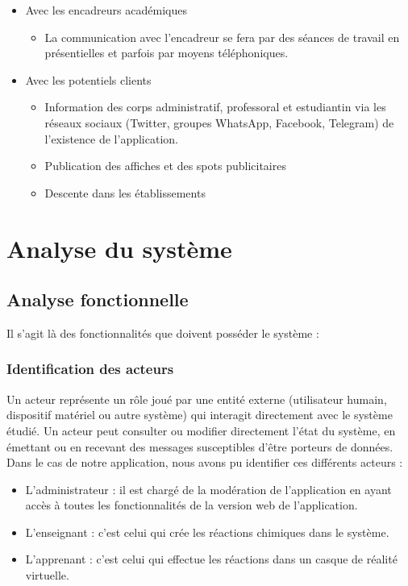 \begin{itemize}
	\item Avec les encadreurs académiques
	      \begin{itemize}
		      \item La communication avec l’encadreur se fera par des séances de travail en présentielles et parfois par moyens téléphoniques.
	      \end{itemize}
	\item Avec les potentiels clients
	      \begin{itemize}
		      \item Information des corps administratif, professoral et estudiantin via les réseaux sociaux (Twitter, groupes WhatsApp, Facebook, Telegram) de l’existence de l’application.
		      \item Publication des affiches et des spots publicitaires
		      \item Descente dans les établissements
	      \end{itemize}
\end{itemize}

\section{Analyse du système}

\subsection{Analyse fonctionnelle} %
\label{sub:analyse-fonctionnelle}

Il s’agit là des fonctionnalités que doivent posséder le système :

\subsubsection{Identification des acteurs} %

Un acteur représente un rôle joué par une entité externe (utilisateur humain, dispositif matériel ou autre système) qui interagit directement avec le système étudié. Un acteur peut consulter ou modifier directement l’état du système, en émettant ou en recevant des messages susceptibles d’être porteurs de données. Dans le cas de notre application, nous avons pu identifier ces différents acteurs :

\begin{itemize}
	\item L’administrateur : il est chargé de la modération de l'application en ayant accès à toutes les fonctionnalités de la version web de l'application.
	\item L’enseignant : c'est celui qui crée les réactions chimiques dans le système.
	\item L’apprenant : c'est celui qui effectue les réactions dans un casque de réalité virtuelle.
\end{itemize}

